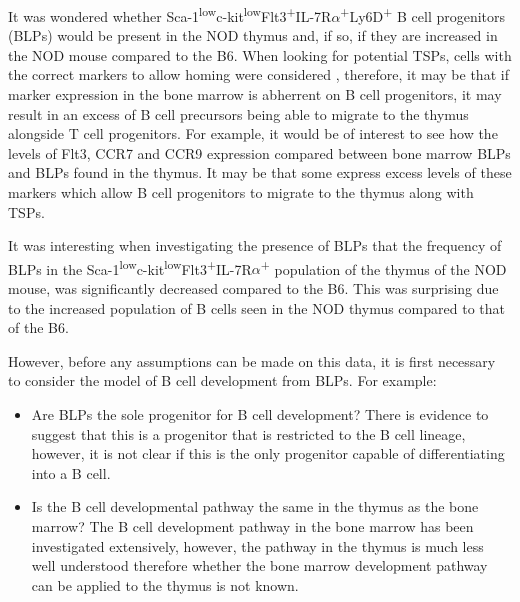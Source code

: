 It was wondered whether Sca-1\textsuperscript{low}c-kit\textsuperscript{low}Flt3\textsuperscript{+}IL-7R$\alpha$\textsuperscript{+}Ly6D\textsuperscript{+} B cell progenitors (BLPs) would be present in the NOD thymus and, if so, if they are increased in the NOD mouse compared to the B6.
When looking for potential TSPs, cells with the correct markers to allow homing were considered \citep{Zlotoff2011}, therefore, it may be that if marker expression in the bone marrow is abherrent on B cell progenitors, it may result in an excess of B cell precursors being able to migrate to the thymus alongside T cell progenitors.
For example, it would be of interest to see how the levels of Flt3, CCR7 and CCR9 expression compared between bone marrow BLPs and BLPs found in the thymus.
It may be that some express excess levels of these markers which allow B cell progenitors to migrate to the thymus along with TSPs.

It was interesting when investigating the presence of BLPs that the frequency of BLPs in the Sca-1\textsuperscript{low}c-kit\textsuperscript{low}Flt3\textsuperscript{+}IL-7R$\alpha$\textsuperscript{+} population of the thymus of the NOD mouse, was significantly decreased compared to the B6.
This was surprising due to the increased population of B cells seen in the NOD thymus compared to that of the B6.

However, before any assumptions can be made on this data, it is first necessary to consider the model of B cell development from BLPs.
For example:
\begin{itemize}
\item Are BLPs the sole progenitor for B cell development? There is evidence to suggest that this is a progenitor that is restricted to the B cell lineage, however, it is not clear if this is the only progenitor capable of differentiating into a B cell.
\item Is the B cell developmental pathway the same in the thymus as the bone marrow? The B cell development pathway in the bone marrow has been investigated extensively, however, the pathway in the thymus is much less well understood therefore whether the bone marrow development pathway can be applied to the thymus is not known. 
\end{itemize}

